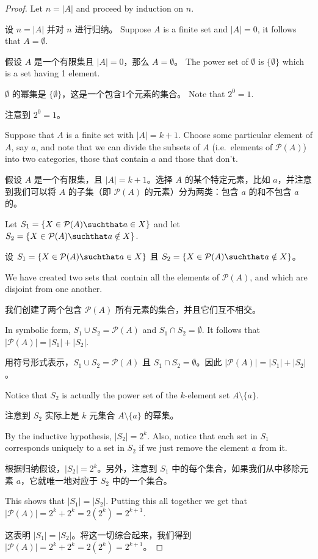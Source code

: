 \begin{proof}
Let $n = |A|$ and proceed by induction on $n$.

设 $n = |A|$ 并对 $n$ 进行归纳。
 Suppose $A$ is a finite set and $|A| = 0$, it follows 
that $A = \emptyset$.

 假设 $A$ 是一个有限集且 $|A| = 0$，那么 $A = \emptyset$。
The power set of $\emptyset$ is $\{ \emptyset \}$ 
which is a set having 1 element.

$\emptyset$ 的幂集是 $\{ \emptyset \}$，这是一个包含1个元素的集合。
Note that $2^0 = 1$.
   
注意到 $2^0 = 1$。
   
  Suppose that $A$ is a finite set with $|A| = k+1$.  Choose some particular element of $A$, say $a$, and note that
we can divide the subsets of $A$ (i.e.\ elements of ${\mathcal P}(A)$) into
two categories, those that contain $a$ and those that don't.

 假设 $A$ 是一个有限集，且 $|A| = k+1$。选择 $A$ 的某个特定元素，比如 $a$，并注意到我们可以将 $A$ 的子集（即 ${\mathcal P}(A)$ 的元素）分为两类：包含 $a$ 的和不包含 $a$ 的。

Let $S_1 = \{ X \in {\mathcal P}(A) \suchthat a \in X \}$ and let
$S_2 = \{ X \in {\mathcal P}(A) \suchthat a \notin X \}$.

设 $S_1 = \{ X \in {\mathcal P}(A) \suchthat a \in X \}$ 且 $S_2 = \{ X \in {\mathcal P}(A) \suchthat a \notin X \}$。

We have 
created two sets that contain all the elements of ${\mathcal P}(A)$,
and which are disjoint from one another.

我们创建了两个包含 ${\mathcal P}(A)$ 所有元素的集合，并且它们互不相交。

In symbolic form, 
$S_1 \cup S_2 = {\mathcal P}(A)$ and $S_1 \cap S_2 = \emptyset$.
It follows that $|{\mathcal P}(A)| = |S_1| + |S_2|$.  

用符号形式表示，$S_1 \cup S_2 = {\mathcal P}(A)$ 且 $S_1 \cap S_2 = \emptyset$。因此 $|{\mathcal P}(A)| = |S_1| + |S_2|$。

Notice that $S_2$ is actually the power set of the $k$-element set
$A \setminus \{ a \}$.

注意到 $S_2$ 实际上是 $k$ 元集合 $A \setminus \{ a \}$ 的幂集。

By the inductive hypothesis, $|S_2| = 2^k$.
Also, notice that each set in $S_1$ corresponds uniquely to a set in
$S_2$ if we just remove the element $a$ from it.

根据归纳假设，$|S_2| = 2^k$。另外，注意到 $S_1$ 中的每个集合，如果我们从中移除元素 $a$，它就唯一地对应于 $S_2$ 中的一个集合。

This shows that 
$|S_1| = |S_2|$.  Putting this all together we get that 
$|{\mathcal P}(A)| = 2^k + 2^k = 2(2^k) = 2^{k+1}$.

这表明 $|S_1| = |S_2|$。将这一切综合起来，我们得到 $|{\mathcal P}(A)| = 2^k + 2^k = 2(2^k) = 2^{k+1}$。

\end{proof}

